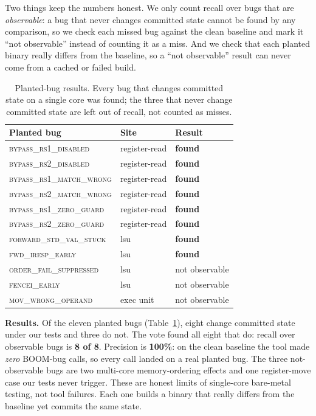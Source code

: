 \documentclass[conference]{IEEEtran}
\newcommand{\cls}[1]{\textsc{#1}}
\begin{document}
Two things keep the numbers honest. We only count recall over bugs that are
\emph{observable}: a bug that never changes committed state cannot be found by
any comparison, so we check each missed bug against the clean baseline and mark
it ``not observable'' instead of counting it as a miss. And we check that each
planted binary really differs from the baseline, so a ``not observable'' result
can never come from a cached or failed build.

\begin{table}[t]
\centering\scriptsize
\setlength{\tabcolsep}{4pt}
\begin{tabular}{lll}
\toprule
Planted bug & Site & Result \\
\midrule
\cls{bypass\_rs1\_disabled}     & register-read & \textbf{found} \\
\cls{bypass\_rs2\_disabled}     & register-read & \textbf{found} \\
\cls{bypass\_rs1\_match\_wrong} & register-read & \textbf{found} \\
\cls{bypass\_rs2\_match\_wrong} & register-read & \textbf{found} \\
\cls{bypass\_rs1\_zero\_guard}  & register-read & \textbf{found} \\
\cls{bypass\_rs2\_zero\_guard}  & register-read & \textbf{found} \\
\cls{forward\_std\_val\_stuck}  & lsu           & \textbf{found} \\
\cls{fwd\_iresp\_early}         & lsu           & \textbf{found} \\
\cls{order\_fail\_suppressed}   & lsu           & not observable \\
\cls{fencei\_early}             & lsu           & not observable \\
\cls{mov\_wrong\_operand}       & exec unit     & not observable \\
\bottomrule
\end{tabular}
\caption{Planted-bug results. Every bug that changes committed state on a single
core was found; the three that never change committed state are left out of
recall, not counted as misses.}
\label{tab:seedresults}
\end{table}

\textbf{Results.} Of the eleven planted bugs (Table~\ref{tab:seedresults}),
eight change committed state under our tests and three do not. The vote found
all eight that do: recall over observable bugs is \textbf{8 of 8}. Precision is
\textbf{100\%}: on the clean baseline the tool made \emph{zero} BOOM-bug calls,
so every call landed on a real planted bug. The three not-observable bugs are
two multi-core memory-ordering effects and one register-move case our tests
never trigger. These are honest limits of single-core bare-metal testing, not
tool failures. Each one builds a binary that really differs from the baseline
yet commits the same state.
\end{document}
